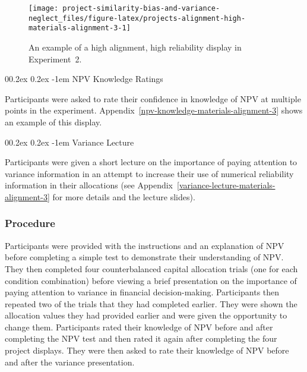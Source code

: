 \documentclass[
  english,
  man, donotrepeattitle,floatsintext]{apa7}
\makeatletter
\let\oldparagraph\paragraph
\renewcommand{\paragraph}[1]{\oldparagraph{#1}\mbox{}}
\renewcommand{\paragraph}{\@startsection{paragraph}{4}{\parindent}%
  {0\baselineskip \@plus 0.2ex \@minus 0.2ex}%
  {-1em}%
  {\normalfont\normalsize\bfseries\itshape\typesectitle}}
\theoremstyle{definition}
\theoremstyle{definition}
\theoremstyle{definition}
\theoremstyle{definition}
\theoremstyle{remark}
\makeatother
\begin{document}
\begin{figure}
\texttt{[image: project-similarity-bias-and-variance-neglect\_files/figure-latex/projects-alignment-high-materials-alignment-3-1]} \caption{An example of a high alignment, high reliability display in Experiment~2.}\label{fig:projects-alignment-high-materials-alignment-3}
\end{figure}

\hypertarget{npv-knowledge-ratings}{%
\paragraph{NPV Knowledge Ratings}\label{npv-knowledge-ratings}}

Participants were asked to rate their confidence in knowledge of NPV at multiple
points in the experiment. Appendix~\ref{npv-knowledge-materials-alignment-3}
shows an example of this display.

\hypertarget{variance-lecture}{%
\paragraph{Variance Lecture}\label{variance-lecture}}

Participants were given a short lecture on the importance of paying attention to
variance information in an attempt to increase their use of numerical
reliability information in their allocations (see
Appendix~\ref{variance-lecture-materials-alignment-3} for more details and the
lecture slides).

\hypertarget{procedure-alignment-3}{%
\subsubsection{Procedure}\label{procedure-alignment-3}}

Participants were provided with the instructions and an explanation of NPV
before completing a simple test to demonstrate their understanding of NPV. They
then completed four counterbalanced capital allocation trials (one for each
condition combination) before viewing a brief presentation on the importance of
paying attention to variance in financial decision-making. Participants then
repeated two of the trials that they had completed earlier. They were shown the
allocation values they had provided earlier and were given the opportunity to
change them. Participants rated their knowledge of NPV before and after
completing the NPV test and then rated it again after completing the four
project displays. They were then asked to rate their knowledge of NPV before and
after the variance presentation.
\end{document}
